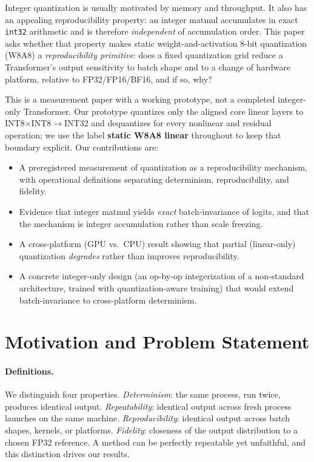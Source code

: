 \documentclass[wcp]{jmlr}
\begin{document}
Integer quantization is usually motivated by memory and throughput. It also has an
appealing reproducibility property: an integer matmul accumulates in exact
\texttt{int32} arithmetic and is therefore \emph{independent} of accumulation order.
This paper asks whether that property makes static weight-and-activation 8-bit
quantization (W8A8) a \emph{reproducibility primitive}: does a fixed quantization
grid reduce a Transformer's output sensitivity to batch shape and to a change of
hardware platform, relative to FP32/FP16/BF16, and if so, why?

This is a measurement paper with a working prototype, not a completed integer-only
Transformer. Our prototype quantizes only the aligned core linear layers to
INT8$\times$INT8$\to$INT32 and dequantizes for every nonlinear and residual
operation; we use the label \textbf{static W8A8 linear} throughout to keep that
boundary explicit. Our contributions are:
\begin{itemize}
  \item A preregistered measurement of quantization as a reproducibility mechanism,
  with operational definitions separating determinism, reproducibility, and fidelity.
  \item Evidence that integer matmul yields \emph{exact} batch-invariance of logits,
  and that the mechanism is integer accumulation rather than scale freezing.
  \item A cross-platform (GPU vs.\ CPU) result showing that partial (linear-only)
  quantization \emph{degrades} rather than improves reproducibility.
  \item A concrete integer-only design (an op-by-op integerization of a
  non-standard architecture, trained with quantization-aware training) that would
  extend batch-invariance to cross-platform determinism.
\end{itemize}

\section{Motivation and Problem Statement}
\paragraph{Definitions.} We distinguish four properties. \emph{Determinism}: the
same process, run twice, produces identical output. \emph{Repeatability}: identical
output across fresh process launches on the same machine. \emph{Reproducibility}:
identical output across batch shapes, kernels, or platforms. \emph{Fidelity}:
closeness of the output distribution to a chosen FP32 reference. A method can be
perfectly repeatable yet unfaithful, and this distinction drives our results.
\end{document}
